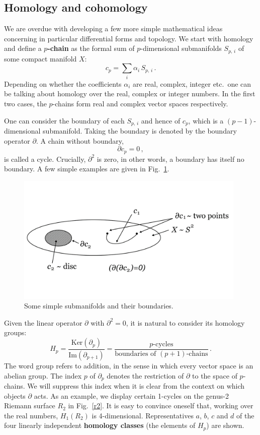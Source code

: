 \documentclass[12pt]{article}
\newcommand{\be}{\begin{equation}}
\newcommand{\ee}{\end{equation}}
\numberwithin{equation}{section}
\begin{document}
\subsection{Homology and cohomology}

We are overdue with developing a few more simple mathematical ideas concerning in particular differential forms and topology. We start with homology and define a {\bf $p$-chain} as the formal sum of $p$-dimensional submanifolds $S_{p,\,i}$ of some compact manifold $X$:
\be
c_p=\sum_i \alpha_i \,S_{p,\,i}\,.
\ee
Depending on whether the coefficients $\alpha_i$ are real, complex, integer etc.~one can be talking about homology over the real, complex or integer numbers. In the first two cases, the $p$-chains form real and complex vector spaces respectively.

One can consider the boundary of each $S_{p,\,i}$ and hence of $c_p$, which is a $(p-1)$-dimensional submanifold. Taking the boundary is denoted by the boundary operator $\partial$. A chain without boundary,
\be
\partial c_p=0\,,
\ee
is called a cycle. Crucially, $\partial^2$ is zero, in other words, a boundary has itself no boundary. A few simple examples are given in Fig.~\ref{sexa}. 

\begin{figure}[ht]
\begin{center} 
\includegraphics[width=11cm]{sexa.png}
\caption{Some simple submanifolds and their boundaries.}
\label{sexa} 
\end{center}
\end{figure}

Given the linear operator $\partial$ with $\partial^2=0$, it is natural to consider its homology groups:
\be
H_p=\frac{\mbox{Ker}(\partial_p)}{\mbox{Im}(\partial_{p+1})}=\frac{\mbox{$p$-cycles}}{\mbox{boundaries of $(p+1)$-chains}}\,.
\ee
The word group refers to addition, in the sense in which every vector space is an abelian group. The index $p$ of $\partial_p$ denotes the restriction of $\partial$ to the space of $p$-chains. We will suppress this index when it is clear from the context on which objects $\partial$ acts. As an example, we display certain 1-cycles on the genus-2 Riemann surface $R_2$ in Fig.~\ref{r2}. It is easy to convince oneself that, working over the real numbers, $H_1(R_2)$ is 4-dimensional. Representatives $a$, $b$, $c$ and $d$ of the four linearly independent {\bf homology classes} (the elements of $H_p$) are shown. 
\end{document}
